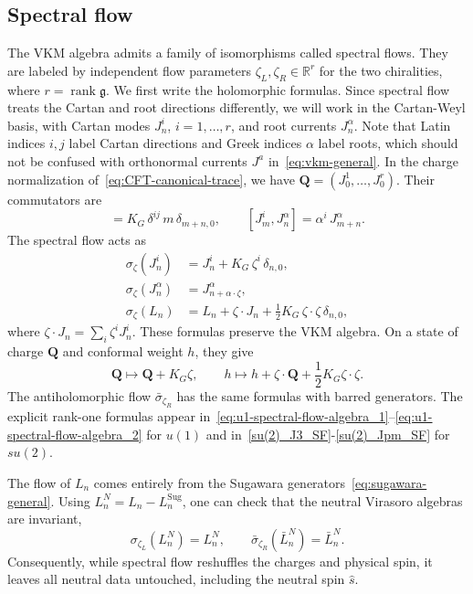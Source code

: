 \documentclass[11pt]{article}
\numberwithin{equation}{section}
\begin{document}
\subsection{Spectral flow}
\label{sec:spectral-flow-general}
The VKM algebra admits a family of isomorphisms called spectral flows.
They are labeled by independent flow parameters $\zeta_L,\zeta_R\in\mathbb R^r$ for the two chiralities, where $r=\operatorname{rank}\mathfrak g$.  We first write the holomorphic formulas. Since spectral flow treats the Cartan and root directions differently, we will work in the Cartan-Weyl basis, with Cartan modes $J^i_n$, $i=1,\dots,r$, and root currents
$J^\alpha_n$. Note that Latin indices $i,j$ label Cartan directions and Greek indices $\alpha$
label roots, which should not be confused with orthonormal currents $J^a$ in~\eqref{eq:vkm-general}. In the charge normalization of~\eqref{eq:CFT-canonical-trace}, we have $\mathbf Q=(J^1_0,\ldots,J^r_0)$. Their commutators are
\begin{equation}
[J^i_m,J^j_n]=K_G\,\delta^{ij}\,m\,\delta_{m+n,0},\qquad
  [J^i_m,J^\alpha_n]=\alpha^i\,J^\alpha_{m+n}.
  \label{eq:cartan_weyl}
\end{equation}
The spectral flow acts as
\begin{equation}
\begin{aligned}
  \sigma_\zeta(J^i_n)&=J^i_n+K_G\,\zeta^i\,\delta_{n,0},\\
  \sigma_\zeta(J^\alpha_n)&=J^\alpha_{n+\alpha\cdot\zeta},\\
  \sigma_\zeta(L_n)&=L_n+\zeta\cdot J_n+\tfrac12K_G\,\zeta\cdot\zeta\,\delta_{n,0},
\end{aligned}
\label{eq:general-flow}
\end{equation}
 where $\zeta\cdot J_n=\sum_i\zeta^i J^i_n$. These formulas preserve the VKM algebra.   
On a state of charge $\mathbf Q$ and conformal weight $h$, they give
\begin{equation}
\mathbf Q\longmapsto\mathbf Q+ K_G\zeta,
 \qquad h\longmapsto h+\zeta\cdot\mathbf Q
                  +\frac12  K_G \zeta\cdot\zeta.
\label{eq:general-flow-state}
\end{equation}
The antiholomorphic flow $\bar\sigma_{\zeta_R}$ has the same formulas with barred generators. The explicit rank-one formulas appear in~\eqref{eq:u1-spectral-flow-algebra_1}--\eqref{eq:u1-spectral-flow-algebra_2} for $u(1)$ and in~\eqref{su(2)_J3_SF}-\eqref{su(2)_Jpm_SF} for $su(2)$. 

The flow of $L_n$ comes entirely from the Sugawara generators~\eqref{eq:sugawara-general}. Using $L_n^N=L_n-L_n^{\mathrm{Sug}}$, one can check that the neutral Virasoro algebras are invariant,
\begin{equation}
\sigma_{\zeta_L}(L^N_n)=L^N_n,\qquad
       \bar\sigma_{\zeta_R}(\bar L^N_n)=\bar L^N_n.
\label{eq:neutral-invariant}
\end{equation}
Consequently, while spectral flow reshuffles the charges and physical spin, it leaves all neutral data untouched, including the neutral spin $\hat{s}$.
\end{document}

